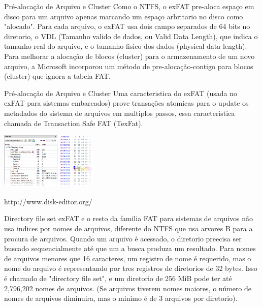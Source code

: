 \documentclass[11pt]{beamer}
\begin{document}
\begin{frame}{Pré-alocação de Arquivo e Cluster}
Como o NTFS, o exFAT pre-aloca espaço em disco para um arquivo apenas marcando um espaço arbritario no disco como "alocado". Para cada arquivo, o exFAT usa dois campo separados de 64 bits no diretorio, o VDL (Tamanho valido de dados, ou Valid Data Length), que indica o tamanho real do arquivo, e o tamanho fisico dos dados (physical data length).
Para melhorar a alocação de blocos (cluster) para o armazenamento de um novo arquivo, a Microsoft incorporou um método de pre-alocação-contigo para blocos (cluster) que ignora a tabela FAT.
\end{frame}

\begin{frame}{Pré-alocação de Arquivo e Cluster}
Uma caracteristica do exFAT (usada no exFAT para sistemas embarcados) prove transações atomicas para o update os metadados do sistema de arquivos em multiplos passos, essa caracteristica chamada de Transaction Safe FAT (TexFat).
\begin{center}
 \includegraphics[width=0.35\textwidth]{entradaexfat.png} 
\end{center}
http://www.disk-editor.org/
\end{frame}

\begin{frame}{Directory file set}
exFAT e o resto da familia FAT para sistemas de arquivos não usa indices por nomes de arquivos, diferente do NTFS que usa arvores B para a procura de arquivos. Quando um arquivo é acessado, o diretorio preecisa ser buscado sequencialmente até que um a busca produza um resultado. Para nomes de arquivos menores que 16 caracteres, um registro de nome é requerido, mas o nome do arquivo é representando por tres registros de diretorios de 32 bytes. Isso é chamado de "directory file set", e um diretorio de 256 MiB pode ter até 2,796,202 nomes de arquivos. (Se arquivos tiverem nomes maiores, o número de nomes de arquivos diminuira, mas o minimo é de 3 arquivos por diretorio).
\end{frame}
\end{document}
